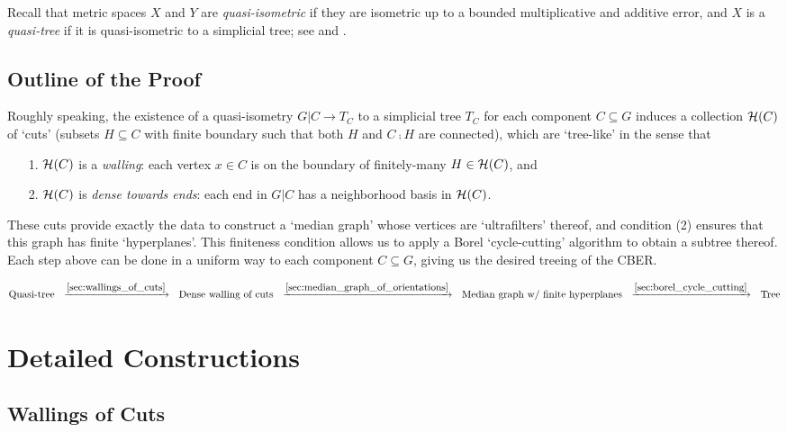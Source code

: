 \documentclass{amsart}
\begin{document}
    Recall that metric spaces $X$ and $Y$ are \textit{quasi-isometric} if they are isometric up to a bounded multiplicative and additive error, and $X$ is a \textit{quasi-tree} if it is quasi-isometric to a simplicial tree; see \cite{Gro93} and \cite{DK18}.

    \subsection{Outline of the Proof}

    Roughly speaking, the existence of a quasi-isometry $G|C\to T_C$ to a simplicial tree $T_C$ for each component $C\subseteq G$ induces a collection $\mathcal{H}(C)$ of `cuts' (subsets $H\subseteq C$ with finite boundary such that both $H$ and $C\comp H$ are connected), which are `tree-like' in the sense that
    \begin{enumerate}
        \item[1.] $\mathcal{H}(C)$ is a \textit{walling}: each vertex $x\in C$ is on the boundary of finitely-many $H\in\mathcal{H}(C)$, and
        \item[2.] $\mathcal{H}(C)$ is \textit{dense towards ends}: each end in $G|C$ has a neighborhood basis in $\mathcal{H}(C)$.
    \end{enumerate}
    These cuts provide exactly the data to construct a `median graph' whose vertices are `ultrafilters' thereof, and condition (2) ensures that this graph has finite `hyperplanes'. This finiteness condition allows us to apply a Borel `cycle-cutting' algorithm to obtain a subtree thereof. Each step above can be done in a uniform way to each component $C\subseteq G$, giving us the desired treeing of the CBER.

    \vspace{-0.1in}

    \begin{equation*}
        \textrm{Quasi-tree}\ \ \xrightarrow{\ref{sec:wallings_of_cuts}}\ \ 
        \textrm{Dense walling of cuts}\ \ \xrightarrow{\ref{sec:median_graph_of_orientations}}\ \ 
        \textrm{Median graph w/ finite hyperplanes}\ \ \xrightarrow{\ref{sec:borel_cycle_cutting}}\ \ 
        \textrm{Tree}
    \end{equation*}

    \section{Detailed Constructions}

    \subsection{Wallings of Cuts}\label{sec:wallings_of_cuts}
\end{document}
